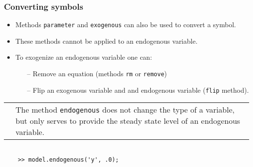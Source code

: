 \documentclass[10pt,slidestop]{beamer}
\makeatletter
\theoremstyle{plain}
\newcommand{\dnote}[1]{%
    \noindent %
    \begin{tabular}{@{}m{0.13\textwidth}@{}m{0.87\textwidth}@{}}%
        \huge\textdbend &#1%
    \end{tabular}%
    \par %
}
\makeatother
\begin{document}
\begin{frame}[c,fragile]
  \frametitle{Converting symbols}

  \begin{itemize}

  \item Methods \verb+parameter+ and \verb+exogenous+ can also be used to convert a symbol.\newline

  \item These methods cannot be applied to an endogenous variable.\newline

  \item To exogenize an endogenous variable one can:
    \begin{itemize}
    \item[--] Remove an equation (methods \verb+rm+ or \verb+remove+)
    \item[--] Flip an exogenous variable and and endogenous variable (\verb+flip+ method).
    \end{itemize}

  \end{itemize}

    \bigskip

    \dnote{The method \texttt{endogenous} does not change the type of a variable, but only serves to provide the steady state level of an endogenous variable.}

    \begin{lstlisting}[style=MatlabConsole]

    >> model.endogenous('y', .0);
  \end{lstlisting}

\end{frame}
\end{document}
